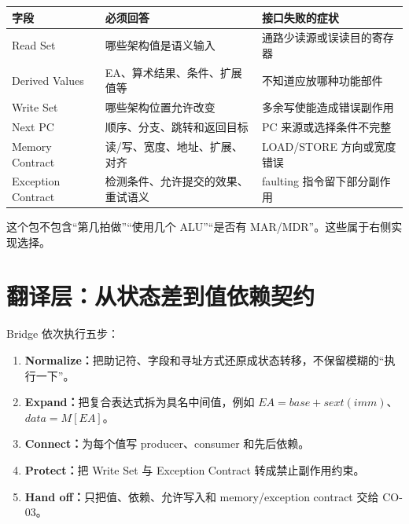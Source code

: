 \documentclass[UTF8,fontset=fandol,11pt,a4paper]{ctexart}
\newcommand{\kw}[1]{\textbf{\color{deep}#1}}
\begin{document}
\begin{center}
\small
\begin{tabularx}{\linewidth}{L{2.4cm}Y Y}
\toprule
字段 & 必须回答 & 接口失败的症状\\
\midrule
Read Set & 哪些架构值是语义输入 & 通路少读源或误读目的寄存器\\
Derived Values & EA、算术结果、条件、扩展值等 & 不知道应放哪种功能部件\\
Write Set & 哪些架构位置允许改变 & 多余写使能造成错误副作用\\
Next PC & 顺序、分支、跳转和返回目标 & PC 来源或选择条件不完整\\
Memory Contract & 读/写、宽度、地址、扩展、对齐 & LOAD/STORE 方向或宽度错误\\
Exception Contract & 检测条件、允许提交的效果、重试语义 & faulting 指令留下部分副作用\\
\bottomrule
\end{tabularx}
\end{center}

这个包不包含“第几拍做”“使用几个 ALU”“是否有 MAR/MDR”。这些属于右侧实现选择。

\section{翻译层：从状态差到值依赖契约}

Bridge 依次执行五步：
\begin{enumerate}
  \item \kw{Normalize：}把助记符、字段和寻址方式还原成状态转移，不保留模糊的“执行一下”。
  \item \kw{Expand：}把复合表达式拆为具名中间值，例如 $EA=base+sext(imm)$、$data=M[EA]$。
  \item \kw{Connect：}为每个值写 producer、consumer 和先后依赖。
  \item \kw{Protect：}把 Write Set 与 Exception Contract 转成禁止副作用约束。
  \item \kw{Hand off：}只把值、依赖、允许写入和 memory/exception contract 交给 CO-03。
\end{enumerate}

\begin{center}
\end{center}
\end{document}
